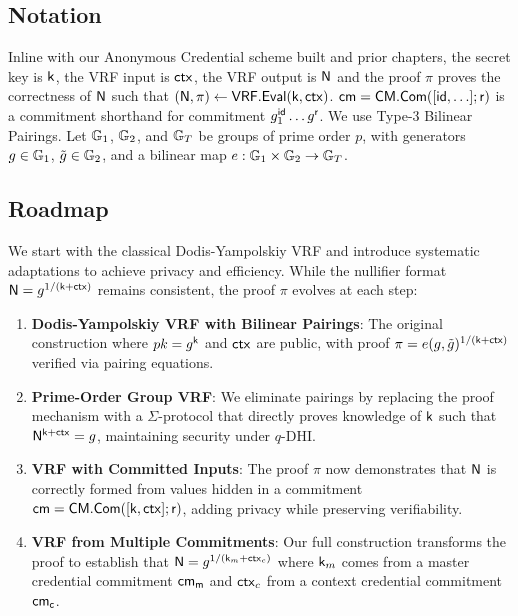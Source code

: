 \subsection*{Notation}
Inline with our Anonymous Credential scheme built and prior chapters, the secret key is $\mathsf{k}$, the VRF input is $\mathsf{ctx}$, the VRF output is $\mathsf{N}$ and the proof $\pi$ proves the correctness of $\mathsf{N}$ such that $(\mathsf{N}, \pi) \gets \mathsf{VRF.Eval}(\mathsf{k}, \mathsf{ctx})$. $\mathsf{cm} = \mathsf{CM.Com}([\mathsf{id},\ldots];\mathsf{r})$ is a commitment shorthand for commitment $g_1^{\mathsf{id}} \ldots g^{\mathsf{r}}$. We use Type-3 Bilinear Pairings. Let $\mathbb{G}_1$, $\mathbb{G}_2$, and $\mathbb{G}_T$ be groups of prime order $p$, with generators $g \in \mathbb{G}_1$, $\tilde{g} \in \mathbb{G}_2$, and a bilinear map $e: \mathbb{G}_1 \times \mathbb{G}_2 \to \mathbb{G}_T$.

\subsection*{Roadmap}
We start with the classical Dodis-Yampolskiy VRF \cite{hutchison_verifiable_2005} and introduce systematic adaptations to achieve privacy and efficiency. While the nullifier format $\mathsf{N} = g^{1/(\mathsf{k}+\mathsf{ctx})}$ remains consistent, the proof $\pi$ evolves at each step:

\begin{enumerate}
    \item \textbf{Dodis-Yampolskiy VRF with Bilinear Pairings}: The original construction where $pk = g^{\mathsf{k}}$ and $\mathsf{ctx}$ are public, with proof $\pi = e(g, \tilde{g})^{1/(\mathsf{k} + \mathsf{ctx})}$ verified via pairing equations.
    
    \item \textbf{Prime-Order Group VRF}: We eliminate pairings by replacing the proof mechanism with a $\Sigma$-protocol that directly proves knowledge of $\mathsf{k}$ such that $\mathsf{N}^{\mathsf{k}+\mathsf{ctx}} = g$, maintaining security under $q$-DHI.
    
    \item \textbf{VRF with Committed Inputs}: The proof $\pi$ now demonstrates that $\mathsf{N}$ is correctly formed from values hidden in a commitment $\mathsf{cm} = \mathsf{CM.Com}([\mathsf{k}, \mathsf{ctx}]; \mathsf{r})$, adding privacy while preserving verifiability.
    
    \item \textbf{VRF from Multiple Commitments}: Our full construction transforms the proof to establish that $\mathsf{N} = g^{1/(\mathsf{k}_m + \mathsf{ctx}_c)}$ where $\mathsf{k}_m$ comes from a master credential commitment $\mathsf{cm_m}$ and $\mathsf{ctx}_c$ from a context credential commitment $\mathsf{cm_c}$.
\end{enumerate}

